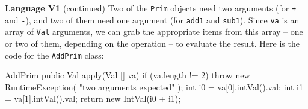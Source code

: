 \begin{minipage}[t]{\sw}
\slidenumber
\LARGE
{\bf Language V1} (continued)\exx
Two of the \verb'Prim' objects need two arguments
(for \verb'+' and \verb'-'),
and two of them need one argument
(for \verb'add1' and \verb'sub1').
Since \verb'va' is an array of \verb'Val' arguments,
we can grab the appropriate items from this array --
one or two of them, depending on the operation --
to evaluate the result.
Here is the code for the \verb'AddPrim' class:
\begin{qv}
AddPrim
    public Val apply(Val [] va) {
        if (va.length != 2)
            throw new RuntimeException(
                "two arguments expected"
            );
        int i0 = va[0].intVal().val;
        int i1 = va[1].intVal().val;
        return new IntVal(i0 + i1);
    }
\end{qv}
\end{minipage}
